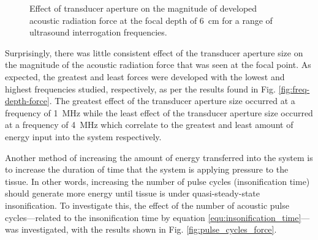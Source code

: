 			\begin{figure}[!htb]
				\centering
				\caption[Effect of transducer aperture on the magnitude of acoustic radiation force]{Effect of transducer aperture on the magnitude of developed acoustic radiation force at the focal depth of \SI{6}{\cm} for a range of ultrasound interrogation frequencies.}
				\label{fig:trans-width-force}
			\end{figure}

			Surprisingly, there was little consistent effect of the transducer aperture size on the magnitude of the acoustic radiation force that was seen at the focal point. As expected, the greatest and least forces were developed with the lowest and highest frequencies studied, respectively, as per the results found in Fig. \ref{fig:freq-depth-force}. The greatest effect of the transducer aperture size occurred at a frequency of \SI{1}{\MHz} while the least effect of the transducer aperture size occurred at a frequency of \SI{4}{\MHz} which correlate to the greatest and least amount of energy input into the system respectively.

			Another method of increasing the amount of energy transferred into the system is to increase the duration of time that the system is applying pressure to the tissue. In other words, increasing the number of pulse cycles (insonification time) should generate more energy until tissue is under quasi-steady-state insonification. To investigate this, the effect of the number of acoustic pulse cycles---related to the insonification time by equation \ref{equ:insonification_time}---was investigated, with the results shown in Fig. \ref{fig:pulse_cycles_force}.

